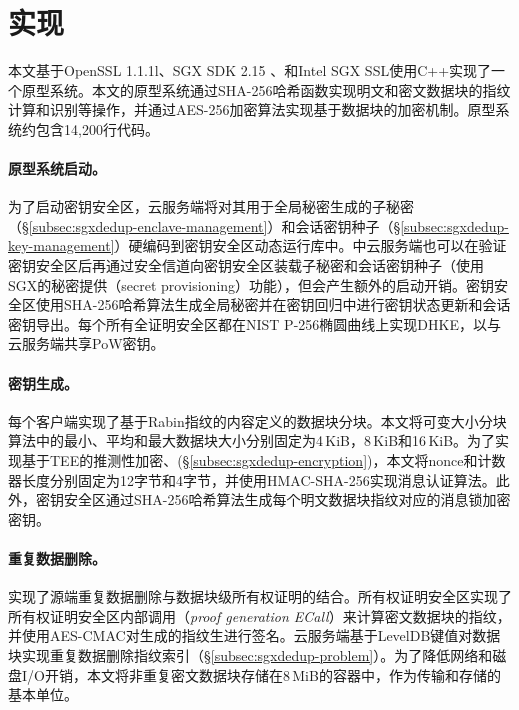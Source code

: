 \section{\sysnameS 实现}
\label{sec:sgxdedup-implementation}

本文基于OpenSSL 1.1.1l\cite{openssl}、SGX SDK 2.15\cite{sgxsdk} 、和Intel SGX SSL\cite{sgxssl}使用C++实现了一个\sysnameS 原型系统。本文的原型系统通过SHA-256哈希函数实现明文和密文数据块的指纹计算和识别等操作，并通过AES-256加密算法实现基于数据块的加密机制。原型系统约包含14,200行代码。

\paragraph*{原型系统启动。} 
为了启动密钥安全区，云服务端将对其用于全局秘密生成的子秘密（\S\ref{subsec:sgxdedup-enclave-management}）和会话密钥种子（\S\ref{subsec:sgxdedup-key-management}）硬编码到密钥安全区动态运行库中。\sysnameS 中云服务端也可以在验证密钥安全区后再通过安全信道向密钥安全区装载子秘密和会话密钥种子（使用SGX\cite{sgx}的秘密提供（secret provisioning）功能），但会产生额外的启动开销。密钥安全区使用SHA-256哈希算法生成全局秘密并在密钥回归中进行密钥状态更新和会话密钥导出。每个所有全证明安全区都在NIST P-256椭圆曲线\cite{nist}上实现DHKE，以与云服务端共享PoW密钥。

\paragraph*{密钥生成。}每个客户端实现了基于Rabin指纹\cite{rabin81}的内容定义的数据块分块。本文将可变大小分块算法中的最小、平均和最大数据块大小分别固定为4\,KiB，8\,KiB和16\,KiB。为了实现基于TEE的推测性加密、(\S\ref{subsec:sgxdedup-encryption})，本文将nonce和计数器长度分别固定为12字节和4字节，并使用HMAC-SHA-256实现消息认证算法。此外，密钥安全区通过SHA-256哈希算法生成每个明文数据块指纹对应的消息锁加密密钥。

\paragraph*{重复数据删除。}\sysnameS 实现了源端重复数据删除与数据块级所有权证明的结合。所有权证明安全区实现了所有权证明安全区内部调用（\textit{proof generation ECall}）来计算密文数据块的指纹，并使用AES-CMAC对生成的指纹生进行签名。云服务端基于LevelDB\cite{leveldb}键值对数据块实现重复数据删除指纹索引（\S\ref{subsec:sgxdedup-problem}）。为了降低网络和磁盘I/O开销，本文将非重复密文数据块存储在8\,MiB的容器中，作为传输和存储的基本单位\cite{lillibridge13}。

